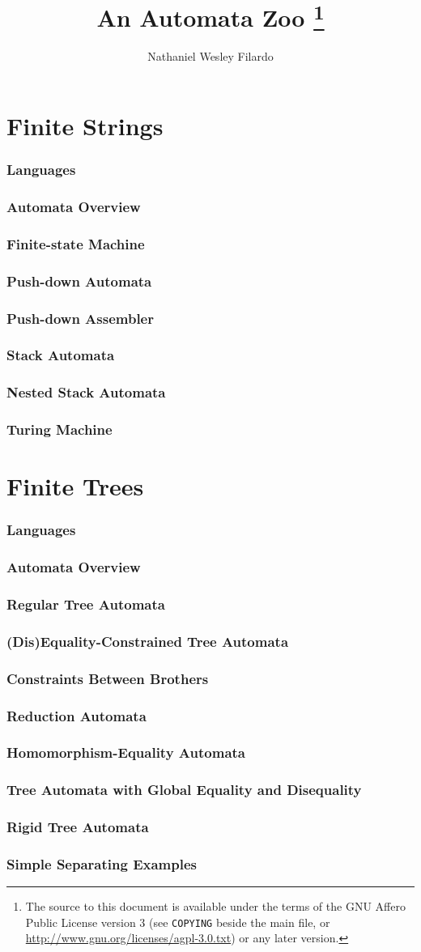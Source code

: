 \documentclass[letterpaper]{article}
\title{An Automata Zoo%
%
\footnote{The source to this document is available under the terms of the
GNU Affero Public License version 3 (see {\tt COPYING} beside the main file,
or \url{http://www.gnu.org/licenses/agpl-3.0.txt}) or any later version.}}
\author{Nathaniel Wesley Filardo}
\newcommand{\maininclude}[2]{\section{#1} \label{sec:#2} }
\begin{document}
\maketitle


\part{Finite Strings}
\maininclude{Languages}{strlang}
\maininclude{Automata Overview}{strautintro}
\maininclude{Finite-state Machine}{zoo-str/fsm}
\maininclude{Push-down Automata}{zoo-str/pda}
\maininclude{Push-down Assembler}{zoo-str/pa}
\maininclude{Stack Automata}{zoo-str/stack}
\maininclude{Nested Stack Automata}{zoo-str/nested-stack}
\maininclude{Turing Machine}{zoo-str/tm}


\part{Finite Trees}
\maininclude{Languages}{treelang}
\maininclude{Automata Overview}{treeautintro}
\maininclude{Regular Tree Automata}{zoo-tree/regular}
\maininclude{(Dis)Equality-Constrained Tree Automata}{zoo-tree/awedc}
\maininclude{Constraints Between Brothers}{zoo-tree/awcbb}
\maininclude{Reduction Automata}{zoo-tree/ra}
\maininclude{Homomorphism-Equality Automata}{zoo-tree/tahom}
\maininclude{Tree Automata with Global Equality and Disequality}{zoo-tree/taged}
\maininclude{Rigid Tree Automata}{zoo-tree/rta}
\maininclude{Simple Separating Examples}{tree-sepex}


\appendix


\glsaddall
\printglossaries
\end{document}
